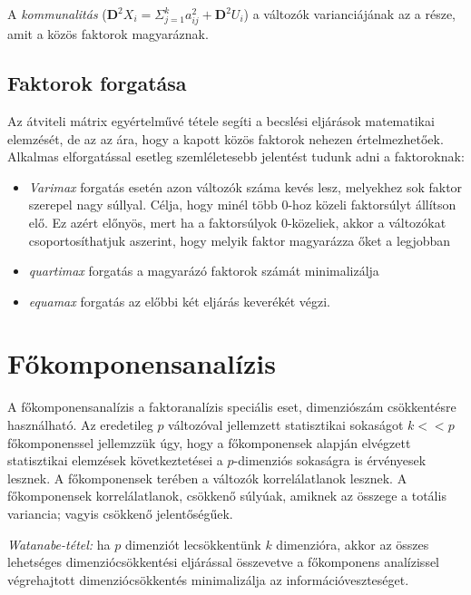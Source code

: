 A \emph{kommunalitás} ($\mathbf{D}^2X_i = \Sigma_{j=1}^k a^2_{ij} + \mathbf{D}^2U_i$) a változók varianciájának az a része, amit a közös faktorok magyaráznak.

\subsection{Faktorok forgatása}

Az átviteli mátrix egyértelművé tétele segíti a becslési eljárások matematikai elemzését, de az az ára, hogy a kapott közös faktorok nehezen értelmezhetőek. Alkalmas elforgatással esetleg szemléletesebb jelentést tudunk adni a faktoroknak:
\begin{itemize}
\item \emph{Varimax} forgatás esetén azon változók száma kevés lesz, melyekhez sok faktor szerepel nagy súllyal. Célja, hogy minél több 0-hoz közeli faktorsúlyt állítson elő. Ez azért előnyös, mert ha a faktorsúlyok 0-közeliek, akkor a változókat csoportosíthatjuk aszerint, hogy melyik faktor magyarázza őket a legjobban
\item \emph{quartimax} forgatás a magyarázó faktorok számát minimalizálja

\item \emph{equamax} forgatás az előbbi két eljárás keverékét végzi.
\end{itemize}

\section{Főkomponensanalízis}

A főkomponensanalízis a faktoranalízis speciális eset, dimenziószám csökkentésre használható. Az eredetileg $p$ változóval jellemzett statisztikai sokaságot $k<<p$ főkomponenssel jellemzzük úgy, hogy a főkomponensek alapján elvégzett statisztikai elemzések következtetései a $p$-dimenziós sokaságra is érvényesek lesznek. A főkomponensek terében a változók korrelálatlanok lesznek. A főkomponensek korrelálatlanok, csökkenő súlyúak, amiknek az összege a totális variancia; vagyis csökkenő jelentőségűek.

\emph{Watanabe-tétel:} ha $p$ dimenziót lecsökkentünk $k$ dimenzióra, akkor az összes lehetséges dimenziócsökkentési eljárással összevetve a főkomponens analízissel végrehajtott dimenziócsökkentés minimalizálja az információveszteséget.